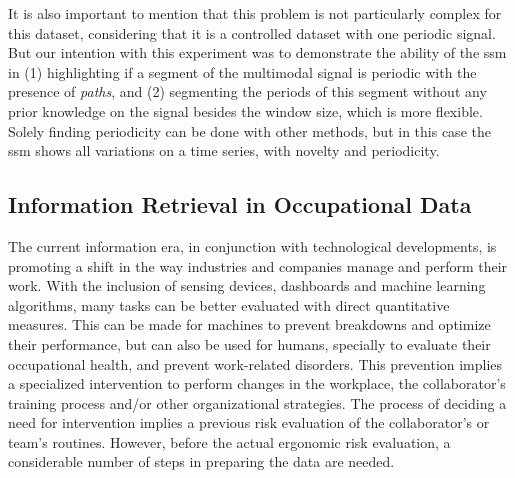 It is also important to mention that this problem is not particularly complex for this dataset, considering that it is a controlled dataset with one periodic signal. But our intention with this experiment was to demonstrate the ability of the \gls{ssm} in (1) highlighting if a segment of the multimodal signal is periodic with the presence of \textit{paths}, and (2) segmenting the periods of this segment without any prior knowledge on the signal besides the window size, which is more flexible. Solely finding periodicity can be done with other methods, but in this case the \gls{ssm} shows all variations on a time series, with novelty and periodicity.

\subsection{Information Retrieval in Occupational Data}
\label{subsec:occupationa_examples}

The current information era, in conjunction with technological developments, is promoting a shift in the way industries and companies manage and perform their work. With the inclusion of sensing devices, dashboards and machine learning algorithms, many tasks can be better evaluated with direct quantitative measures. This can be made for machines to prevent breakdowns and optimize their performance, but can also be used for humans, specially to evaluate their occupational health, and prevent work-related disorders. This prevention implies a specialized intervention to perform changes in the workplace, the collaborator's training process and/or other organizational strategies. The process of deciding a need for intervention implies a previous risk evaluation of the collaborator's or team's routines. However, before the actual ergonomic risk evaluation, a considerable number of steps in preparing the data are needed. 

